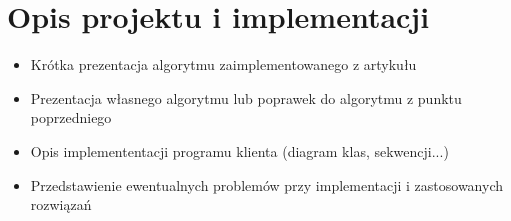 \chapter{Opis projektu i implementacji}
\label{cha:rozdzial4}

\begin{itemize}
\item Krótka prezentacja algorytmu zaimplementowanego z artykułu 
\item Prezentacja własnego algorytmu lub poprawek do algorytmu z punktu poprzedniego
\item Opis implemententacji programu klienta (diagram klas, sekwencji...)
\item Przedstawienie ewentualnych problemów przy implementacji i zastosowanych rozwiązań
\end{itemize}